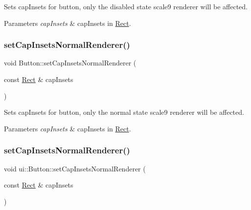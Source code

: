 Sets cap\+Insets for button, only the disabled state scale9 renderer will be affected.


\begin{DoxyParams}{Parameters}
{\em cap\+Insets} & cap\+Insets in \hyperlink{classRect}{Rect}. \\
\hline
\end{DoxyParams}
\mbox{\label{classui_1_1Button_a30bc1a9949dc48217e760d9b5998053b}} 
\subsubsection{\texorpdfstring{set\+Cap\+Insets\+Normal\+Renderer()}{setCapInsetsNormalRenderer()}\hspace{0.1cm}{\footnotesize\ttfamily [1/2]}}
{\footnotesize\ttfamily void Button\+::set\+Cap\+Insets\+Normal\+Renderer (\begin{DoxyParamCaption}\item[{const \hyperlink{classRect}{Rect} \&}]{cap\+Insets }\end{DoxyParamCaption})}

Sets cap\+Insets for button, only the normal state scale9 renderer will be affected.


\begin{DoxyParams}{Parameters}
{\em cap\+Insets} & cap\+Insets in \hyperlink{classRect}{Rect}. \\
\hline
\end{DoxyParams}
\mbox{\label{classui_1_1Button_a0ff8b92e2542a1012b2bebe838b4c69e}} 
\subsubsection{\texorpdfstring{set\+Cap\+Insets\+Normal\+Renderer()}{setCapInsetsNormalRenderer()}\hspace{0.1cm}{\footnotesize\ttfamily [2/2]}}
{\footnotesize\ttfamily void ui\+::\+Button\+::set\+Cap\+Insets\+Normal\+Renderer (\begin{DoxyParamCaption}\item[{const \hyperlink{classRect}{Rect} \&}]{cap\+Insets }\end{DoxyParamCaption})}

